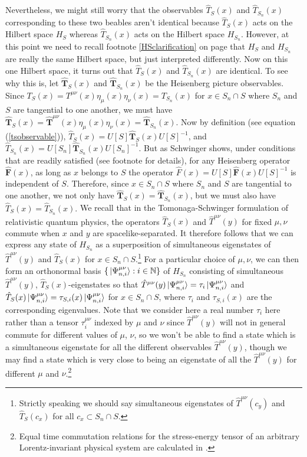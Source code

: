 {Nevertheless, we might still worry that the observables $\hat{T}_{S}(x)$ and  $\hat{T}_{S_n}(x)$ corresponding to these two beables aren't identical because $\hat{T}_{S}(x)$ acts on the Hilbert space $H_S$ whereas $\hat{T}_{S_n}(x)$ acts on the Hilbert space $H_{S_n}$. However, at this point we need to recall footnote \ref{HSclarification} on page \pageref{HSclarification} that $H_{S}$ and $H_{S_n}$ are really the same Hilbert space, but just interpreted differently. Now on this one Hilbert space, it turns out that $\hat{T}_{S}(x)$ and  $\hat{T}_{S_n}(x)$ are identical. To see why this is, let $\hat{\bm{T}}_S(x)$ and $\hat{\bm{T}}_{S_n}(x)$ be the Heisenberg picture observables. Since $T_S(x)=T^{\mu\nu}(x)\eta_{\mu}(x)\eta_{\nu}(x)=T_{S_n}(x)$ for $x\in S_n\cap S$ where $S_n$ and $S$ are tangential to one another, we must have $\hat{\bm{T}}_S(x)=\hat{\bm{T}}^{\mu\nu}(x)\eta_{\mu}(x)\eta_{\nu}(x)=\hat{\bm{T}}_{S_n}(x)$. Now by definition (see equation (\ref{tsobservable})), $\hat{T}_S(x)=U[S]\hat{\bm{T}}_S(x)U[S]^{-1}$, and $\hat{T}_{S_n}(x)=U[S_n]\hat{\bm{T}}_{S_n}(x)U[S_n]^{-1}$.  But as Schwinger shows, under conditions that are readily satisfied (see footnote  for details), for any Heisenberg operator $\hat{\bm{F}}(x)$, as long as $x$ belongs to $S$ the operator $\hat{F}(x)=U[S]\hat{\bm{F}}(x)U[S]^{-1}$ is independent of $S$. Therefore, since $x\in S_n\cap S$ where $S_n$ and $S$ are tangential to one another, we not only have $\hat{\bm{T}}_S(x)=\hat{\bm{T}}_{S_n}(x)$, but we must also have $\hat{T}_S(x)=\hat{T}_{S_n}(x)$.} We recall that in the Tomonaga-Schwinger formulation of relativistic quantum physics, the operators $\hat{T}_S(x)$ and $\hat{T}^{\mu\nu}(y)$ for fixed $\mu,\nu$ commute when $x$ and $y$ are spacelike-separated. It therefore follows that we can express any state of $H_{S_n}$ as a superposition of simultaneous eigenstates of $\hat{T}^{\mu\nu}(y)$ and $\hat{T}_S(x)$ for $x\in S_n\cap S$.\footnote{Strictly \label{snapprox} speaking we should say simultaneous eigenstates of $\hat{T}^{\mu\nu}(c_y)$ and $\hat{T}_S(c_x)$ for all $c_x\subset S_n\cap S$.}  For a particular choice of $\mu,\nu$, we can then form an orthonormal basis $\{\ket*{\Psi_{n,i}^{\mu\nu}}:i\in\mathbb{N}\}$ of $H_{S_n}$ consisting of simultaneous $\hat{T}^{\mu\nu}(y)$, $\hat{T}_S(x)$-eigenstates so that $\hat{T}^{\mu\nu}(y)\ket*{\Psi_{n,i}^{\mu\nu}}=\tau_{i}\ket*{\Psi_{n,i}^{\mu\nu}}$ and $\hat{T}_{S}(x)\ket*{\Psi_{n,i}^{\mu\nu}}=\tau_{S,i}(x)\ket*{\Psi_{n,i}^{\mu\nu}}$ for $x\in S_n\cap S$, where $\tau_{i}$ and $\tau_{S,i}(x)$ are the corresponding eigenvalues. Note that we consider here a real number $\tau_{i}$ here rather than a tensor $\tau_i^{\mu\nu}$ indexed by $\mu$ and $\nu$  since $\hat{T}^{\mu\nu}(y)$ will not in general commute for different values of $\mu$, $\nu$, so we won't be able to find a state which is a simultaneous eigenstate for all the different observables $\hat{T}^{\mu\nu}(y)$, though we may find a state which is very close to being an eigenstate of all the  $\hat{T}^{\mu\nu}(y)$ for different $\mu$ and $\nu$.\footnote{Equal time commutation relations for the stress-energy tensor of an arbitrary Lorentz-invariant physical system are calculated in \cite{BergstromK.1970ECRf}.}  

